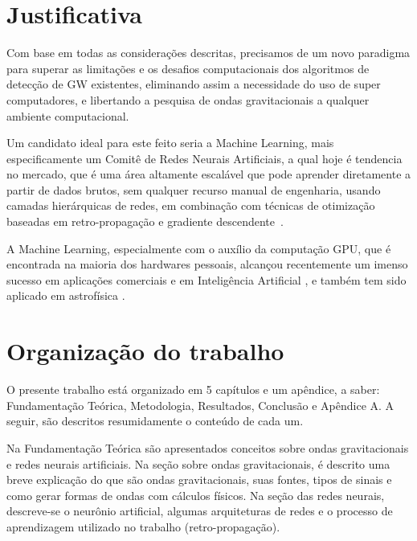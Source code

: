 \section{Justificativa}

Com base em todas as considerações descritas, precisamos de um novo paradigma para superar as limitações e os desafios computacionais dos algoritmos de detecção de GW existentes, eliminando assim a necessidade do uso de super computadores, e libertando a pesquisa de ondas gravitacionais a qualquer ambiente computacional.

Um candidato ideal para este feito seria a Machine Learning, mais especificamente um Comitê de Redes Neurais Artificiais, a qual hoje é tendencia no mercado, que é uma área  altamente escalável que pode aprender diretamente a partir de dados brutos, sem qualquer recurso manual de engenharia, usando camadas hierárquicas de redes, em combinação com técnicas de otimização baseadas em retro-propagação e gradiente descendente~\cite{barca2005treinamento}. 

A Machine Learning, especialmente com o auxílio da computação GPU, que é encontrada na maioria dos hardwares pessoais, alcançou recentemente um imenso sucesso em aplicações comerciais e em Inteligência Artificial \cite{esteva2017dermatologist, moravvcik2017deepstack, van2016wavenet, 10.1007/978-3-319-44188-7_16}, e também tem sido aplicado em astrofísica \cite{shen2017denoising,PhysRevLett.120.141103,krastev2019real,gebhard2019convolutional,mukund2017transient,kim2015application,george2018deep,george2017glitch, george2017deepA}.

\section{Organização do trabalho}

O presente trabalho está organizado em 5 capítulos e um apêndice, a saber: Fundamentação Teórica, Metodologia, Resultados, Conclusão e Apêndice A. A seguir, são descritos resumidamente o conteúdo de cada um.

Na Fundamentação Teórica são apresentados conceitos sobre ondas gravitacionais e redes neurais artificiais. Na seção sobre ondas gravitacionais, é descrito uma breve explicação do que são ondas gravitacionais, suas fontes, tipos de sinais e como gerar formas de ondas com cálculos físicos. Na seção das redes neurais, descreve-se o neurônio artificial, algumas arquiteturas de redes e o processo de aprendizagem utilizado no trabalho (retro-propagação). 

